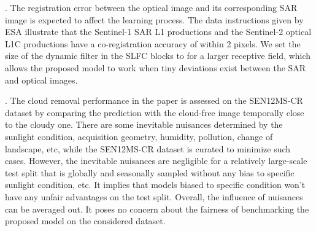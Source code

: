 \documentclass[a4paper,fleqn]{cas-dc}
\begin{document}
\begin{table}[!t]
    \small
    \centering
    \caption{Performance of proposed algorithm with use of despeckled SAR data.}
    \label{despeckled-table}
    \vspace{-5mm}
\end{table}

.
The registration error between the optical image and its corresponding SAR image is expected to affect the learning process. The data instructions given by ESA illustrate that the Sentinel-1 SAR L1 productions and the Sentinel-2 optical L1C productions have a co-registration accuracy of within 2 pixels. We set the size of the dynamic filter in the SLFC blocks to  for a larger receptive field, which allows the proposed model to work when tiny deviations exist between the SAR and optical images. 

.  The cloud removal performance in the paper is assessed on the SEN12MS-CR dataset by comparing the prediction with the cloud-free image temporally close to the cloudy one. There are some inevitable nuisances determined by the sunlight condition, acquisition geometry, humidity, pollution, change of landscape, etc, while the SEN12MS-CR dataset is curated to minimize such cases. However, the inevitable nuisances are negligible for a relatively large-scale test split that is globally and seasonally sampled without any bias to specific sunlight condition, etc. It implies that models biased to specific condition won't have any unfair advantages on the test split. Overall, the influence of nuisances can be averaged out. It poses no concern about the fairness of benchmarking the proposed model on the considered dataset. 
\end{document}
